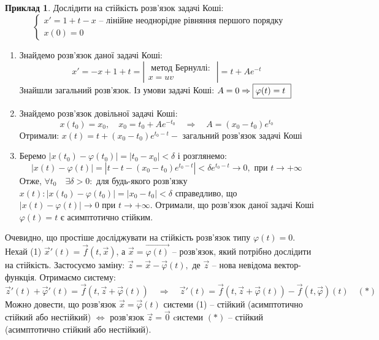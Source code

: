 \documentclass[14pt,a4paper]{scrartcl}
\theoremstyle{definition}
\newtheorem*{example}{Приклад}
\theoremstyle{definition}
\theoremstyle{definition}
\begin{document}
\begin{example}
    Дослідити на стійкість розв'язок  задачі Коші:
    $$
    \begin{cases}
        x' = 1 + t - x \text{  -- лінійне неоднорідне рівняння першого порядку}\\
        x(0) = 0
    \end{cases}
    $$
    \begin{enumerate}

    \item Знайдемо розв'язок даної задачі Коші:
    $$
    x' = - x + 1 + t = \left| \begin{gathered}
     \text{ метод Бернуллі: } \\ x = uv
    \end{gathered}\right| = t + Ae^{-t}
    $$
    Знайшли загальний розв'язок. Із умови задачі Коші: $ A = 0 \Rightarrow \fbox {$\varphi(t) = t$ }$

    \item Знайдемо розв'язок довільної задачі Коші:
    $$
    x(t_0) = x_0, \quad x_0 = t_0 + Ae^{-t_0} \quad \Rightarrow \quad A = (x_0 - t_0) e^{t_0}
    $$
    Отримали: $x(t) = t + (x_0 - t_0) e^{t_0 - t} - \text{ загальний розв'язок задачі Коші}$

    \item Беремо $\left| x(t_0) - \varphi(t_0) \right| = |t_0 - x_0| < \delta$ і розглянемо:
    $$\left| x(t) - \varphi(t) \right| = |t - t - (x_0 - t_0)e^{t_0 - t}| < \delta e^{t_0 - t} \rightarrow 0, \text{ при } t \rightarrow + \infty$$
    Отже, $\forall t_0 \quad \exists \delta > 0 :$ для будь-якого розв'язку $x(t): |x(t_0) - \varphi(t_0)| = |x_0 - t_0| < \delta$ справедливо, що $|x(t) - \varphi(t)| \rightarrow 0 \text{ при } t \rightarrow + \infty$. Отримали, що розв'язок даної задачі Коші $\varphi(t) = t$ є асимптотично стійким.
    \end{enumerate}
\end{example}

\remark
Очевидно, що простіше досліджувати на стійкість розв'язок типу $\varphi(t) = 0$. Нехай (1) $\overrightarrow{x}'(t) = \overrightarrow{f}(t, \overrightarrow{x})$, а $\overrightarrow{x} = \overrightarrow{\varphi(t)}$ -- розв'язок, який потрібно дослідити на стійкість. Застосуємо заміну: $\overrightarrow{z} = \overrightarrow{x} - \overrightarrow{\varphi}(t), \text{ де } \overrightarrow{z}$ -- нова невідома вектор-функція. Отримаємо систему:
$$
\overrightarrow{z}'(t) + \overrightarrow{\varphi}'(t) = \overrightarrow{f}(t, \overrightarrow{z} + \overrightarrow{\varphi}(t)) \quad \Rightarrow \quad \overrightarrow{z}'(t) = \overrightarrow{f}(t, \overrightarrow{z} + \overrightarrow{\varphi}(t)) - \overrightarrow{f}(t, \overrightarrow{\varphi})(t) \quad (*)
$$
Можно довести, що розв'язок $\overrightarrow{x} = \overrightarrow{\varphi}(t)$ системи (1) -- стійкий (асимптотично стійкий або нестійкий) $\Longleftrightarrow$ розв'язок $\overrightarrow{z} = \overrightarrow{0}$  cистеми $(*)$ -- стійкий (асимптотично стійкий або нестійкий).
\end{document}
